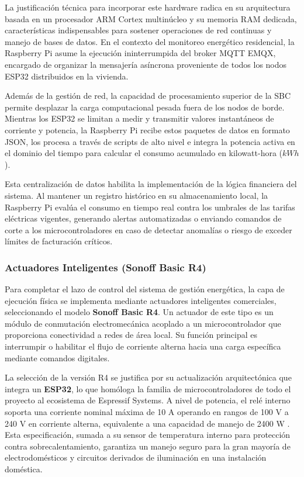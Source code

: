             La justificación técnica para incorporar este hardware radica en su arquitectura basada en un procesador ARM Cortex multinúcleo y su memoria RAM dedicada, características indispensables para sostener operaciones de red continuas y manejo de bases de datos. En el contexto del monitoreo energético residencial, la Raspberry Pi asume la ejecución ininterrumpida del broker MQTT EMQX, encargado de organizar la mensajería asíncrona proveniente de todos los nodos ESP32 distribuidos en la vivienda.

            Además de la gestión de red, la capacidad de procesamiento superior de la SBC permite desplazar la carga computacional pesada fuera de los nodos de borde. Mientras los ESP32 se limitan a medir y transmitir valores instantáneos de corriente y potencia, la Raspberry Pi recibe estos paquetes de datos en formato JSON, los procesa a través de scripts de alto nivel e integra la potencia activa en el dominio del tiempo para calcular el consumo acumulado en kilowatt-hora ($kWh$). 

            Esta centralización de datos habilita la implementación de la lógica financiera del sistema. Al mantener un registro histórico en su almacenamiento local, la Raspberry Pi evalúa el consumo en tiempo real contra los umbrales de las tarifas eléctricas vigentes, generando alertas automatizadas o enviando comandos de corte a los microcontroladores en caso de detectar anomalías o riesgo de exceder límites de facturación críticos.

        \subsubsection{Actuadores Inteligentes (Sonoff Basic R4)}

            Para completar el lazo de control del sistema de gestión energética, la capa de ejecución física se implementa mediante actuadores inteligentes comerciales, seleccionando el modelo \textbf{Sonoff Basic R4}. Un actuador de este tipo es un módulo de conmutación electromecánica acoplado a un microcontrolador que proporciona conectividad a redes de área local. Su función principal es interrumpir o habilitar el flujo de corriente alterna hacia una carga específica mediante comandos digitales.

            La selección de la versión R4 se justifica por su actualización arquitectónica que integra un \textbf{ESP32}, lo que homóloga la familia de microcontroladores de todo el proyecto al ecosistema de Espressif Systems. A nivel de potencia, el relé interno soporta una corriente nominal máxima de 10 A operando en rangos de 100 V a 240 V en corriente alterna, equivalente a una capacidad de manejo de 2400 W \cite{sonoff2023basicr4}. Esta especificación, sumada a su sensor de temperatura interno para protección contra sobrecalentamiento, garantiza un manejo seguro para la gran mayoría de electrodomésticos y circuitos derivados de iluminación en una instalación doméstica.

